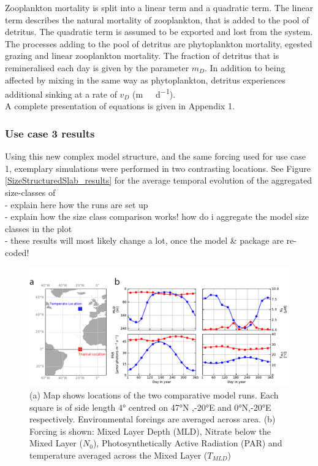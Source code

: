 \documentclass[template.tex]{subfiles}
\begin{document}
Zooplankton mortality is split into a linear term and a quadratic term. The linear term describes the natural mortality of zooplankton, that is added to the pool of detritus. The quadratic term is assumed to be exported and lost from the system.\\

The processes adding to the pool of detritus are phytoplankton mortality, egested grazing and linear zooplankton mortality. The fraction of detritus that is remineralised each day is given by the parameter $m_D$. In addition to being affected by mixing in the same way as phytoplankton, detritus experiences additional sinking at a rate of $v_D$ (\unit{m \ d^{-1}}).\\

A complete presentation of equations is given in Appendix 1.\\

\subsubsection{Use case 3 results}

Using this new complex model structure, and the same forcing used for use case 1, exemplary simulations were performed in two contrasting locations. 
See Figure \ref{SizeStructuredSlab_results} for the average temporal evolution of the aggregated size-classes of \\


- explain here how the runs are set up\\

- explain how the size class comparison works! how do i aggregate the model size classes in the plot\\

- these results will most likely change a lot, once the model & package are re-coded!\\


\clearpage

\begin{figure}[t]
\includegraphics[width=15cm]{Figures/firstdraft_plots/01_forcing_labeled.pdf}
\caption{(a) Map shows locations of the two comparative model runs. Each square is of side length 4° centred on 47°N ,-20°E and 0°N,-20°E respectively. Environmental forcings are averaged across area. (b) Forcing is shown: Mixed Layer Depth (MLD), Nitrate below the Mixed Layer ($N_0$), Photosynthetically Active Radiation (PAR) and temperature averaged across the Mixed Layer ($T_{MLD}$)}
\label{phydraforcing}
\end{figure}
\end{document}
